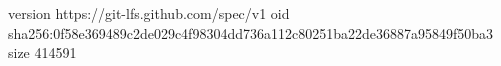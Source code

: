 version https://git-lfs.github.com/spec/v1
oid sha256:0f58e369489c2de029c4f98304dd736a112c80251ba22de36887a95849f50ba3
size 414591
